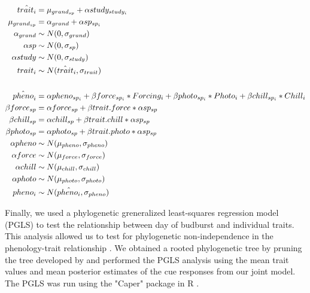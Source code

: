 \documentclass{article}\usepackage[]{graphicx}\usepackage[]{color}
\begin{document}
\begin{align*}
\hat{trait_i} &= \mu_{grand_{sp}} + \alpha study_{study_i} \\
\mu_{grand_{sp}} &= \alpha_{grand} + \alpha sp_{sp_i} \\
\alpha_{grand}  & \sim N(0, \sigma_{grand})\\
\alpha sp & \sim N(0, \sigma_{sp}) \\
\alpha study& \sim N(0, \sigma_{study}) \\
trait_i & \sim N(\hat{trait}_i, \sigma_{trait}) \\
\vspace{1ex}\\

\hat{pheno}_i  &= \alpha pheno_{sp_i} + \beta force_{sp_i} * Forcing_{i} + \beta photo_{sp_i}  * Photo_{i} + \beta chill_{sp_i} * Chill_{i} \\
\beta force_{sp} &= \alpha force_{sp} + \beta trait.force * \alpha sp_{sp}\\
\beta chill_{sp} &= \alpha chill_{sp} + \beta trait.chill * \alpha sp_{sp}\\
\beta photo_{sp} &= \alpha photo_{sp} + \beta trait.photo * \alpha sp_{sp}\\
\alpha pheno & \sim N(\mu_{pheno}, \sigma_{pheno}) \\
\alpha force& \sim N(\mu_{force}, \sigma_{force}) \\
\alpha chill & \sim N(\mu_{chill}, \sigma_{chill}) \\
\alpha photo & \sim N(\mu_{photo}, \sigma_{photo}) \\
pheno_{i} & \sim N(\hat{pheno_i}, \sigma_{pheno}) \\
\end{align*}


Finally, we used a phylogenetic greneralized least-squares regression model (PGLS) to test the relationship between day of budburst and individual traits. This analysis allowed us to test for phylogenetic non-independence in the phenology-trait relationship \citep{Freckleton2002}. We obtained a rooted phylogenetic tree by pruning the tree developed by \citep{Smith2018} and performed the PGLS analysis using the mean trait values and mean posterior estimates of the cue responses from our joint model. The PGLS was run using the "Caper" package in R \citep{Orne2013}.
\end{document}
